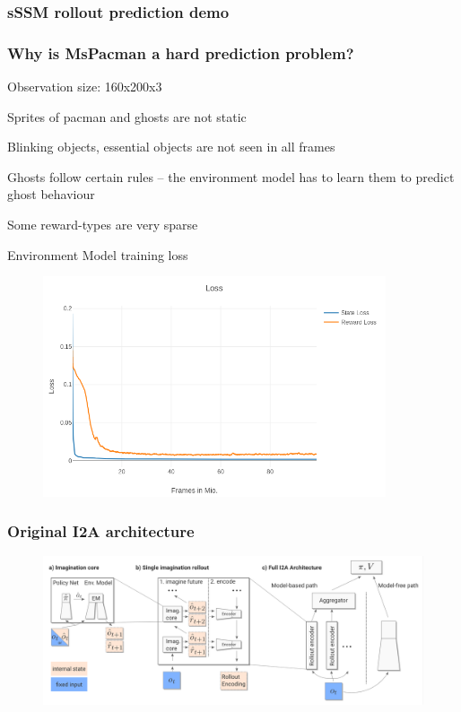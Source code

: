 \begin{frame}
	\frametitle{sSSM rollout prediction demo}
\end{frame}


\begin{frame}
	\frametitle{Why is MsPacman a hard prediction problem?}
	\begin{PraesentationAufzaehlung}
		\item Observation size: 160x200x3
		\item Sprites of pacman and ghosts are not static
		\item Blinking objects, essential objects are not seen in all frames
		\item Ghosts follow certain rules -- the environment model has to learn them to predict ghost behaviour
		\item Some reward-types are very sparse
	\end{PraesentationAufzaehlung}
\end{frame}

    
\begin{frame}{Environment Model training loss}
	\vspace{-10mm}
   	\begin{figure}
       \centering
        \includegraphics[width=0.9\textwidth]{./latent_i2a_images/EnvironmentModel_dSSM-DET_training.png}
    \end{figure}
\end{frame}





\begin{frame}
	\frametitle{Original I2A architecture}
	\begin{figure}
        \centering
        \includegraphics[width=\textwidth]{./latent_i2a_images/i2a_architecture.png}
    \end{figure}
\end{frame}


